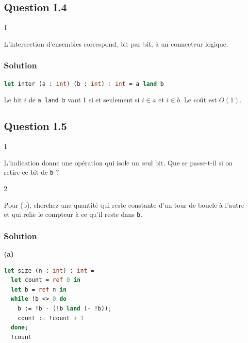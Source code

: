 \documentclass[11pt,a4paper]{article}
\begin{document}
\hypertarget{question-i.4}{%
\subsection{Question I.4}\label{question-i.4}}

\begin{indication}{1}

L'intersection d'ensembles correspond, bit par bit, à un connecteur logique.

\end{indication}

\hypertarget{solution-3}{%
\subsubsection{Solution}\label{solution-3}}

\begin{lstlisting}[language=Caml]
let inter (a : int) (b : int) : int = a land b
\end{lstlisting}

Le bit \(i\) de \texttt{a\ land\ b} vaut 1 si et seulement si \(i\in a\) et \(i\in b\). Le coût est \(O(1)\).

\hypertarget{question-i.5}{%
\subsection{Question I.5}\label{question-i.5}}

\begin{indication}{1}

L'indication donne une opération qui isole un seul bit. Que se passe-t-il si on retire ce bit de \texttt{b} ?

\end{indication}

\begin{indication}{2}

Pour (b), cherchez une quantité qui reste constante d'un tour de boucle à l'autre et qui relie le compteur à ce qu'il reste dans \texttt{b}.

\end{indication}

\hypertarget{solution-4}{%
\subsubsection{Solution}\label{solution-4}}

\textbf{(a)}

\begin{lstlisting}[language=Caml]
let size (n : int) : int =
  let count = ref 0 in
  let b = ref n in
  while !b <> 0 do
    b := !b - (!b land (- !b));
    count := !count + 1
  done;
  !count
\end{lstlisting}
\end{document}
